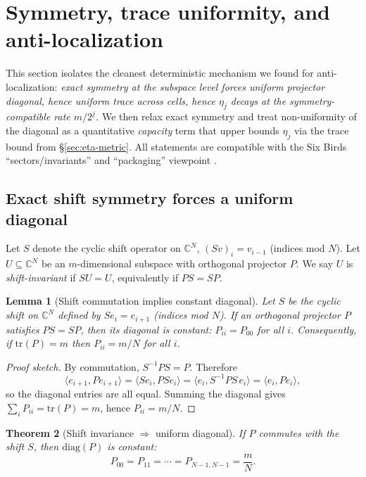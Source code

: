 \documentclass[11pt]{article}
\theoremstyle{plain}
\newtheorem{theorem}{Theorem}[section]
\newtheorem{lemma}[theorem]{Lemma}
\theoremstyle{definition}
\theoremstyle{remark}
\newcommand{\C}{\mathbb{C}}
\begin{document}
 \section{Symmetry, trace uniformity, and anti-localization}\label{sec:symmetry-trace-al}

This section isolates the cleanest deterministic mechanism we found for anti-localization:
\emph{exact symmetry at the subspace level forces uniform projector diagonal, hence uniform trace across cells, hence \(\eta_j\) decays at the symmetry-compatible rate \(m/2^j\).}
We then relax exact symmetry and treat non-uniformity of the diagonal as a quantitative \emph{capacity} term that upper bounds \(\eta_j\) via the trace bound from \S\ref{sec:eta-metric}.
All statements are compatible with the Six Birds ``sectors/invariants'' and ``packaging'' viewpoint \cite{sixbirds_foundations}.

\subsection{Exact shift symmetry forces a uniform diagonal}\label{subsec:exact_shift_symmetry}

Let \(S\) denote the cyclic shift operator on \(\C^N\), \((Sv)_i = v_{i-1}\) (indices mod \(N\)).
Let \(U \subseteq \C^N\) be an \(m\)-dimensional subspace with orthogonal projector \(P\).
We say \(U\) is \emph{shift-invariant} if \(SU = U\), equivalently if \(PS = SP\).

\begin{lemma}[Shift commutation implies constant diagonal]\label{lem:shift-commute-constant-diag}
Let \(S\) be the cyclic shift on \(\mathbb{C}^N\) defined by \(Se_i=e_{i+1}\) (indices mod \(N\)).
If an orthogonal projector \(P\) satisfies \(PS=SP\), then its diagonal is constant: \(P_{ii}=P_{00}\) for all \(i\).
Consequently, if \(\mathrm{tr}(P)=m\) then \(P_{ii}=m/N\) for all \(i\).
\end{lemma}
\begin{proof}[Proof sketch]
By commutation, \(S^{-1}PS=P\). Therefore
\[
\langle e_{i+1},Pe_{i+1}\rangle
=\langle Se_i,PS e_i\rangle
=\langle e_i,S^{-1}PS\,e_i\rangle
=\langle e_i,Pe_i\rangle,
\]
so the diagonal entries are all equal. Summing the diagonal gives \(\sum_i P_{ii}=\mathrm{tr}(P)=m\), hence \(P_{ii}=m/N\).
\end{proof}

\begin{theorem}[Shift invariance \(\Rightarrow\) uniform diagonal]\label{thm:shift_invariance_uniform_diag}
If \(P\) commutes with the shift \(S\), then \(\mathrm{diag}(P)\) is constant:
\[
P_{00} = P_{11} = \cdots = P_{N-1,N-1} = \frac{m}{N}.
\]
\end{theorem}
\end{document}
